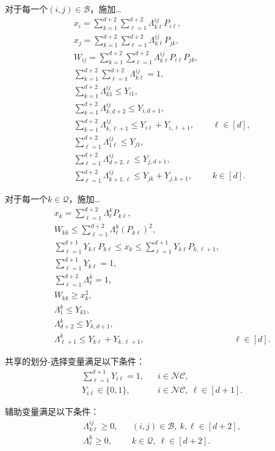 \documentclass{article}
\begin{document}
对于每一个$(i,j)\in\mathcal{B}$，施加…
\begin{align}
&x_i=\sum_{k=1}^{d+2}\sum_{\ell=1}^{d+2}\Lambda^{ij}_{k\ell}P_{i\ell},
\label{eq:pairx1}\\
&x_j=\sum_{k=1}^{d+2}\sum_{\ell=1}^{d+2}\Lambda^{ij}_{k\ell}P_{jk},
\label{eq:pairx2}\\
&W_{ij}=\sum_{k=1}^{d+2}\sum_{\ell=1}^{d+2}\Lambda^{ij}_{k\ell}P_{i\ell}P_{jk},
\label{eq:pairw}\\
&\sum_{k=1}^{d+2}\sum_{\ell=1}^{d+2}\Lambda^{ij}_{k\ell}=1,
\label{eq:pairnormalization}\\
&\sum_{k=1}^{d+2}\Lambda^{ij}_{k1}\leq Y_{i1},
\label{eq:pairleftendpoint}\\
&\sum_{k=1}^{d+2}\Lambda^{ij}_{k,d+2}\leq Y_{i,d+1},
\label{eq:pairrightendpoint}\\
&\sum_{k=1}^{d+2}\Lambda^{ij}_{k,\ell+1}\leq Y_{i\ell}+Y_{i,\ell+1},
&&\ell\in[d],
\label{eq:pairiinterior}\\
&\sum_{\ell=1}^{d+2}\Lambda^{ij}_{1\ell}\leq Y_{j1},
\label{eq:pairjleftendpoint}\\
&\sum_{\ell=1}^{d+2}\Lambda^{ij}_{d+2,\ell}\leq Y_{j,d+1},
\label{eq:pairjrightendpoint}\\
&\sum_{\ell=1}^{d+2}\Lambda^{ij}_{k+1,\ell}\leq Y_{jk}+Y_{j,k+1},
&& k\in[d].
\label{eq:pairjinterior}
\end{align}

对于每一个$k\in\mathcal{Q}$，施加…
\begin{align}
&x_k=\sum_{\ell=1}^{d+2}\Lambda^k_\ell P_{k\ell},
\label{eq:diagx}\\
&W_{kk}\leq\sum_{\ell=1}^{d+2}\Lambda^k_\ell(P_{k\ell})^2,
\label{eq:diagupper}\\
&\sum_{\ell=1}^{d+1}Y_{k\ell}P_{k\ell}
 \leq x_k\leq
 \sum_{\ell=1}^{d+1}Y_{k\ell}P_{k,\ell+1},
\label{eq:diaginterval}\\
&\sum_{\ell=1}^{d+1}Y_{k\ell}=1,
\label{eq:diagpartition}\\
&\sum_{\ell=1}^{d+2}\Lambda^k_\ell=1,
\label{eq:diagnormalization}\\
&W_{kk}\geq x_k^2,
\label{eq:diaglower}\\
&\Lambda^k_1\leq Y_{k1},
\label{eq:diagleftendpoint}\\
&\Lambda^k_{d+2}\leq Y_{k,d+1},
\label{eq:diagrightendpoint}\\
&\Lambda^k_{\ell+1}\leq Y_{k\ell}+Y_{k,\ell+1},
&&\ell\in[d].
\label{eq:diaginterior}
\end{align}

共享的划分-选择变量满足以下条件：
\begin{align}
&\sum_{\ell=1}^{d+1}Y_{i\ell}=1,
&& i\in\mathcal{NC},
\label{eq:partitiononehot}\\
&Y_{i\ell}\in\{0,1\},
&& i\in\mathcal{NC},\ \ell\in[d+1].
\label{eq:binary}
\end{align}

辅助变量满足以下条件：
\begin{align}
&\Lambda^{ij}_{k\ell}\geq 0,
&& (i,j)\in\mathcal{B},\ k,\ell\in[d+2],
\label{eq:pairnonnegative}\\
&\Lambda^k_\ell\geq 0,
&& k\in\mathcal{Q},\ \ell\in[d+2].
\label{eq:diagnonnegative}
\end{align}
\end{document}
